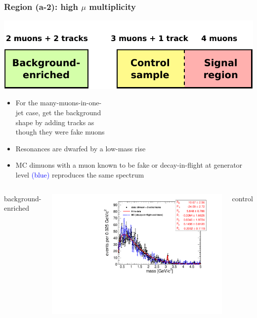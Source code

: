 \documentclass[compress]{beamer}
\begin{document}
\begin{frame}
\frametitle{Region (a-2): high $\mu$ multiplicity}

\hfill \includegraphics[width=0.5\linewidth]{bkgnd_control_signal_a-2.pdf}

\vspace{-1.5 cm}
\begin{itemize}
\item For the many-muons-in-one- \\ jet case, get the background \\ shape by adding tracks as \\ though they were fake muons
\item Resonances are dwarfed by a low-mass rise
\item MC dimuons with a muon known to be fake or decay-in-flight at
  generator level \textcolor{blue}{(blue)} reproduces the same spectrum
\end{itemize}

\begin{columns}
\centering background-enriched

\includegraphics[width=\linewidth]{fullscale-backgroundEnriched_fakes.pdf}

\centering control


\end{columns}
\end{frame}
\end{document}
